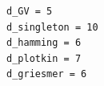 \begin{verbatim}
d_GV = 5
d_singleton = 10
d_hamming = 6
d_plotkin = 7
d_griesmer = 6
\end{verbatim}
